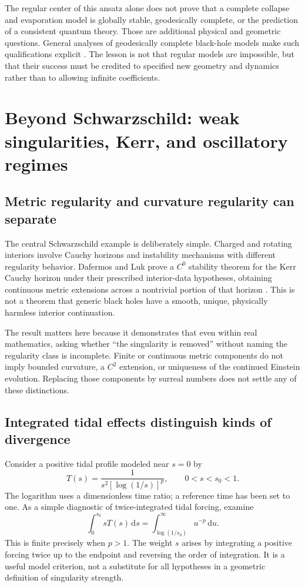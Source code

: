 \documentclass[11pt,letterpaper]{article}
\newcommand{\dd}{\mathrm{d}}
\theoremstyle{definition}
\theoremstyle{remark}
\begin{document}
The regular center of this ansatz alone does not prove that a complete collapse
and evaporation model is globally stable, geodesically complete, or the
prediction of a consistent quantum theory. Those are additional physical and
geometric questions. General analyses of geodesically complete black-hole
models make such qualifications explicit \cite{CarballoRubio}. The lesson is
not that regular models are impossible, but that their success must be credited
to specified new geometry and dynamics rather than to allowing infinite
coefficients.

\section{Beyond Schwarzschild: weak singularities, Kerr, and oscillatory regimes}
\label{sec:beyond}

\subsection{Metric regularity and curvature regularity can separate}

The central Schwarzschild example is deliberately simple. Charged and rotating
interiors involve Cauchy horizons and instability mechanisms with different
regularity behavior. Dafermos and Luk prove a $C^0$ stability theorem for the
Kerr Cauchy horizon under their prescribed interior-data hypotheses, obtaining
continuous metric extensions across a nontrivial portion of that horizon
\cite{DafermosLuk}. This is not a theorem that generic black holes have a smooth,
unique, physically harmless interior continuation.

The result matters here because it demonstrates that even within real
mathematics, asking whether ``the singularity is removed'' without naming the
regularity class is incomplete. Finite or continuous metric components do not
imply bounded curvature, a $C^2$ extension, or uniqueness of the continued
Einstein evolution. Replacing those components by surreal numbers does not
settle any of these distinctions.

\subsection{Integrated tidal effects distinguish kinds of divergence}

Consider a positive tidal profile modeled near $s=0$ by
\begin{equation}
 T(s)=\frac{1}{s^2[\log(1/s)]^p},\qquad 0<s<s_0<1.
 \label{eq:logtidal}
\end{equation}
The logarithm uses a dimensionless time ratio; a reference time has been set
to one. As a simple diagnostic of twice-integrated tidal forcing, examine
\[
 \int_0^{s_0}sT(s)\,\dd s
 =\int_{\log(1/s_0)}^\infty u^{-p}\,\dd u.
\]
This is finite precisely when $p>1$. The weight $s$ arises by integrating a
positive forcing twice up to the endpoint and reversing the order of
integration. It is a useful model criterion, not a substitute for all
hypotheses in a geometric definition of singularity strength.
\end{document}
